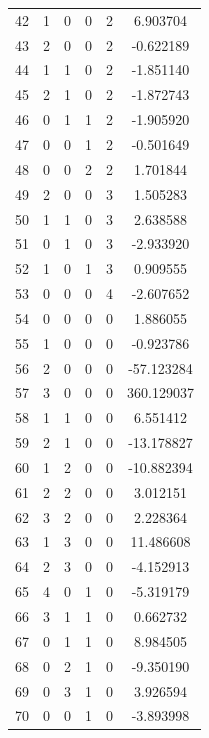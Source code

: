 \documentclass[preprint,12pt]{elsarticle}
\begin{document}
\begin{table}
\begin{minipage}[!h]{0.25\textwidth}
{\begin{tabular}{|c|cccc|c|}
42  &   1 &   0 &   0 &   2 &    6.903704 \\
43  &   2 &   0 &   0 &   2 &   -0.622189 \\
44  &   1 &   1 &   0 &   2 &   -1.851140 \\
45  &   2 &   1 &   0 &   2 &   -1.872743 \\
46  &   0 &   1 &   1 &   2 &   -1.905920 \\
47  &   0 &   0 &   1 &   2 &   -0.501649 \\
48  &   0 &   0 &   2 &   2 &    1.701844 \\
49  &   2 &   0 &   0 &   3 &    1.505283 \\
50  &   1 &   1 &   0 &   3 &    2.638588 \\
51  &   0 &   1 &   0 &   3 &   -2.933920 \\
52  &   1 &   0 &   1 &   3 &    0.909555 \\
53  &   0 &   0 &   0 &   4 &   -2.607652 \\
54  &   0 &   0 &   0 &   0 &    1.886055 \\
55  &   1 &   0 &   0 &   0 &   -0.923786 \\
56  &   2 &   0 &   0 &   0 &  -57.123284 \\
57  &   3 &   0 &   0 &   0 &  360.129037 \\
58  &   1 &   1 &   0 &   0 &    6.551412 \\
59  &   2 &   1 &   0 &   0 &  -13.178827 \\
60  &   1 &   2 &   0 &   0 &  -10.882394 \\
61  &   2 &   2 &   0 &   0 &    3.012151 \\
62  &   3 &   2 &   0 &   0 &    2.228364 \\
63  &   1 &   3 &   0 &   0 &   11.486608 \\
64  &   2 &   3 &   0 &   0 &   -4.152913 \\
65  &   4 &   0 &   1 &   0 &   -5.319179 \\
66  &   3 &   1 &   1 &   0 &    0.662732 \\
67  &   0 &   1 &   1 &   0 &    8.984505 \\
68  &   0 &   2 &   1 &   0 &   -9.350190 \\
69  &   0 &   3 &   1 &   0 &    3.926594 \\
70  &   0 &   0 &   1 &   0 &   -3.893998 \\
\end{tabular}}
\end{minipage}%
%
\begin{minipage}[!h]{0.25\textwidth}

\end{minipage}
\end{table}
\end{document}
